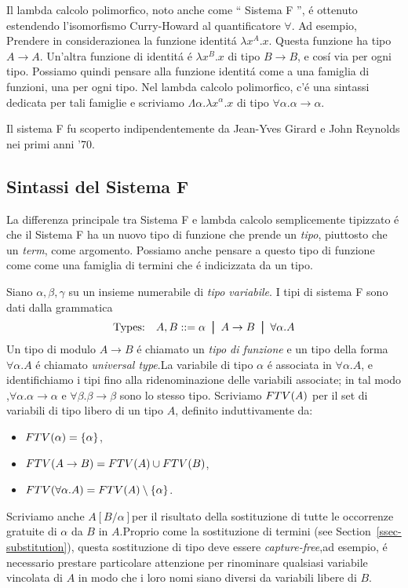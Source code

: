 \documentclass{article}
\begin{document}
Il lambda calcolo polimorfico, noto anche come `` Sistema F '', \'e
ottenuto estendendo l'isomorfismo Curry-Howard al quantificatore
$\forall$. Ad esempio, Prendere in considerazionea la funzione identit\'a $\lambda
x^A.x$.  Questa funzione ha tipo $A\to A$. Un'altra funzione di identit\'a \'e
$\lambda x^B.x$ di tipo $B\to B$, e cos\'i via per ogni tipo. Possiamo
quindi pensare alla funzione identit\'a come a una famiglia di funzioni, una per
ogni tipo. Nel lambda calcolo polimorfico, c'\'e una
sintassi dedicata per tali famiglie e scriviamo $\Lambda\alpha.\lambda
x^\alpha.x$ di tipo $\forall\alpha.\alpha\to\alpha$.

Il sistema F fu scoperto indipendentemente da Jean-Yves Girard e John
Reynolds nei primi anni '70.

\subsection{Sintassi del Sistema F}

La differenza principale tra Sistema F e lambda calcolo semplicemente
tipizzato \'e che il Sistema F ha un nuovo tipo di funzione che prende un
{\em tipo}, piuttosto che un {\em term}, come argomento. Possiamo anche 
pensare a questo tipo di funzione come come una famiglia di termini che \'e 
indicizzata da un tipo.

Siano $\alpha,\beta,\gamma$ su un insieme numerabile di {\em tipo
	variabile}. I tipi di sistema F sono dati dalla grammatica
\[ \mbox{Types:}\ssep A,B \bnf \alpha \bor A\to B\bor \forall\alpha.A
\]
Un tipo di modulo $A\to B$ \'e chiamato un  {\em tipo di funzione} e un 
tipo della forma $\forall\alpha.A$ \'e chiamato {\em universal type}.La 
variabile di tipo $\alpha$ \'e associata in $\forall\alpha.A$, e identifichiamo
i tipi fino alla ridenominazione delle variabili associate; in tal modo
,$\forall\alpha.\alpha\to\alpha$ e $\forall\beta.\beta\to\beta$ sono lo stesso tipo.
Scriviamo $FTV(A)$ per il set di variabili di tipo libero di un tipo $A$, definito induttivamente da:
\begin{itemize}
	\item $FTV(\alpha) = \{\alpha\}$,
	\item $FTV(A\to B) = FTV(A)\cup FTV(B)$,
	\item $FTV(\forall\alpha.A) = FTV(A)\setminus\{\alpha\}$.
\end{itemize}
Scriviamo anche $A[B/\alpha]$per il risultato della sostituzione di tutte le
occorrenze gratuite di $\alpha$ da $B$ in $A$.Proprio come la sostituzione di
termini (see Section~\ref{ssec-substitution}), questa sostituzione di tipo
deve essere {\em capture-free},ad esempio, \'e necessario prestare particolare attenzione per rinominare
qualsiasi variabile vincolata di $A$ in modo che i loro nomi siano diversi da
variabili libere di  $B$.
\end{document}
